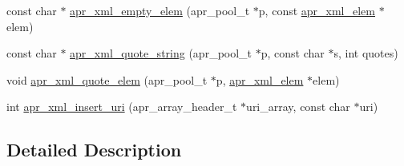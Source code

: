 \begin{DoxyCompactItemize}
\item 
const char $\ast$ \hyperlink{group___a_p_r___util___x_m_l_gabb75f025859b605f28394f82154f7847}{apr\-\_\-xml\-\_\-empty\-\_\-elem} (apr\-\_\-pool\-\_\-t $\ast$p, const \hyperlink{structapr__xml__elem}{apr\-\_\-xml\-\_\-elem} $\ast$elem)
\item 
const char $\ast$ \hyperlink{group___a_p_r___util___x_m_l_ga084970837d60613476e8ac1abd7651f0}{apr\-\_\-xml\-\_\-quote\-\_\-string} (apr\-\_\-pool\-\_\-t $\ast$p, const char $\ast$s, int quotes)
\item 
void \hyperlink{group___a_p_r___util___x_m_l_ga709c6294a67b450459669e3be45a9aba}{apr\-\_\-xml\-\_\-quote\-\_\-elem} (apr\-\_\-pool\-\_\-t $\ast$p, \hyperlink{structapr__xml__elem}{apr\-\_\-xml\-\_\-elem} $\ast$elem)
\item 
int \hyperlink{group___a_p_r___util___x_m_l_ga25a4f0e204fc99ce5000221befc55847}{apr\-\_\-xml\-\_\-insert\-\_\-uri} (apr\-\_\-array\-\_\-header\-\_\-t $\ast$uri\-\_\-array, const char $\ast$uri)
\end{DoxyCompactItemize}


\subsection{Detailed Description}


